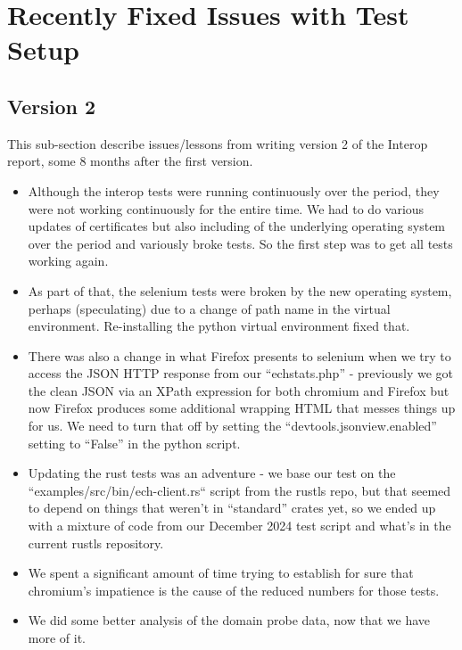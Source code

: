 \section{Recently Fixed Issues with Test Setup}
\label{app:alongtheway}

\subsection{Version 2}

This sub-section describe issues/lessons from writing version 2 of
the Interop report, some 8 months after the first version.

\begin{itemize}

\item Although the interop tests were running continuously over the period,
    they were not working continuously for the entire time. We had to do
        various updates of certificates but also including of the underlying
        operating system over the period and variously broke tests. So the
        first step was to get all tests working again.

\item As part of that, the selenium tests were broken by the new operating
    system, perhaps (speculating) due to a change of path name in the virtual
        environment. Re-installing the python virtual environment fixed that.

\item There was also a change in what Firefox presents to selenium when we
    try to access the JSON HTTP response from our ``echstats.php'' -
        previously we got the clean JSON via an XPath
        expression for both chromium and Firefox but now Firefox produces
        some additional wrapping HTML that messes things up for us. We need
        to turn that off by setting the ``devtools.jsonview.enabled'' setting
        to ``False'' in the python script.

\item Updating the rust tests was an adventure - we base our test on the
    ``examples/src/bin/ech-client.rs`` script from the rustls repo, but 
        that seemed to depend on things that weren't in ``standard'' crates
        yet, so we ended up with a mixture of code from our December 2024
        test script and what's in the current rustls repository.

\item We spent a significant amount of time trying to establish for
    sure that chromium's impatience is the cause of the reduced numbers
    for those tests.

\item We did some better analysis of the domain probe data, now that we
    have more of it.

\end{itemize}

